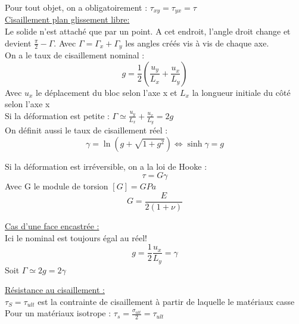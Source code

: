 \documentclass[../main.tex]{subfiles}
\begin{document}
Pour tout objet, on a obligatoirement : $\tau_{xy} = \tau_{yx} = \tau$\\

\quad \underline{Cisaillement plan glissement libre:}\\
Le solide n'est attaché que par un point. A cet endroit, l'angle droit change et devient $\frac{\pi}{2}-\Gamma$. Avec $\Gamma = \Gamma_x+\Gamma_y$ les angles créés vis à vis de chaque axe.\\
On a le taux de cisaillement nominal :\\
\begin{equation}
    g = \frac{1}{2} (\frac{u_y}{L_x} + \frac{u_x}{L_y})
\end{equation}
Avec $u_x$ le déplacement du bloc selon l'axe x et $L_x$ la longueur initiale du côté selon l'axe x\\
Si la déformation est petite : $\Gamma \simeq \frac{u_y}{L_x} + \frac{u_x}{L_y} = 2g$\\

On définit aussi le taux de cisaillement réel :\\
\begin{equation}
    \gamma = \ln{(g+\sqrt{1+g^2})} \Leftrightarrow \sinh{\gamma} = g
\end{equation}

Si la déformation est irréversible, on a la loi de Hooke :\\
\begin{equation}
    \tau = G \gamma
\end{equation}
Avec G le module de torsion $[G] = GPa$\\
\begin{equation}
    G = \frac{E}{2(1+\nu)}
\end{equation}

\quad \underline{Cas d'une face encastrée :}\\
Ici le nominal est toujours égal au réel!\\
\begin{equation}
    g = \frac{1}{2} \frac{u_x}{L_y} = \gamma
\end{equation}
Soit $\Gamma \simeq 2g = 2\gamma$

\quad \underline{Résistance au cisaillement :}\\
$\tau_S = \tau_{ult}$ est la contrainte de cisaillement à partir de laquelle le matériaux casse\\
Pour un matériaux isotrope : $\tau_s = \frac{\sigma_{ult}}{2} = \tau_{ult}$\\
\end{document}
